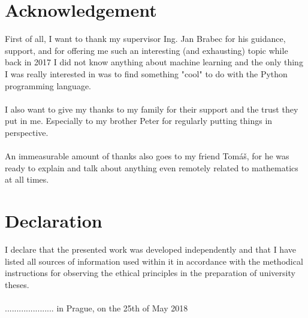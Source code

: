 \documentclass[11pt]{article}
\begin{document}
  \section*{Acknowledgement}
    \thispagestyle{empty}
    First of all, I want to thank my supervisor Ing. Jan Brabec for his guidance, support, and for offering me such an interesting (and exhausting) topic while back in 2017 I did not know anything about machine learning and the only thing I was really interested in was to find something "cool"{ }to do with the Python programming language.
    \\~\\
    I also want to give my thanks to my family for their support and the trust they put in me. Especially to my brother Peter for regularly putting things in perspective.
    \\~\\
    An immeasurable amount of thanks also goes to my friend Tomáš, for he was ready to explain and talk about anything even remotely related to mathematics at all times.
  \newpage
  \section*{Declaration}
    \thispagestyle{empty}
    I declare that the presented work was developed independently and that I have listed all sources of information used within it in accordance with the methodical instructions for observing the ethical principles in the preparation of university theses.
    \\~\\
    ..................... in Prague, on the 25th of May 2018
  \newpage
\end{document}
